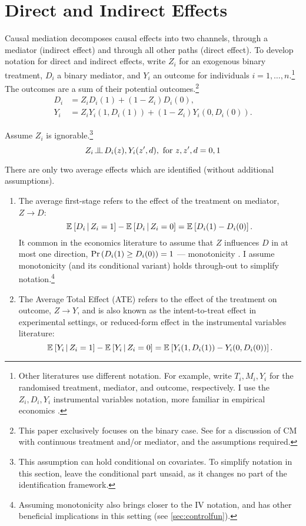 \section{Direct and Indirect Effects}
\label{sec:mediation}
Causal mediation decomposes causal effects into two channels, through a mediator (indirect effect) and through all other paths (direct effect).
To develop notation for direct and indirect effects, write $Z_i$ for an exogenous binary treatment, $D_i$ a binary mediator, and $Y_i$ an outcome for individuals $i = 1, \hdots, n$.\footnote{
    Other literatures use different notation.
    For example, \cite{imai2010identification} write $T_i, M_i, Y_i$ for the randomised treatment, mediator, and outcome, respectively.
    I use the $Z_i, D_i, Y_i$ instrumental variables notation, more familiar in empirical economics \citep{angrist1996identification}.
}
The outcomes are a sum of their potential outcomes.\footnote{
    This paper exclusively focuses on the binary case.
    See \cite{huber2020direct} for a discussion of CM with continuous treatment and/or mediator, and the assumptions required.
}
\begin{align*}
    D_i &= Z_i       D_i(1)
        + (1 - Z_i) D_i(0),  \\
    Y_i &= Z_i       Y_i(1, D_i(1))
        + (1 - Z_i) Y_i(0, D_i(0)).
\end{align*}

Assume $Z_i$ is ignorable.\footnote{
    This assumption can hold conditional on covariates.
    To simplify notation in this section, leave the conditional part unsaid, as it changes no part of the identification framework.
}
\[ Z_i \indep  D_i(z), Y_i(z', d), \textnormal{ for } z, z', d = 0, 1 \]

There are only two average effects which are identified (without additional assumptions).
\begin{enumerate}
    \item The average first-stage refers to the effect of the treatment on mediator, $Z \to D$:
    \[ \mathbb{E}_{} \left[ D_i \, \middle\vert \, Z_i = 1 \right] - \mathbb{E}_{} \left[ D_i \, \middle\vert \, Z_i = 0 \right]
        = \mathbb{E}_{} \left[ D_i(1) - D_i(0) \right]. \]
    It common in the economics literature to assume that $Z$ influences $D$ in at most one direction, $\Pr\left( D_i(1) \geq D_i(0) \right) = 1$ --- monotonicity \citep{imbens1994identification}.
    I assume monotonicity (and its conditional variant) holds through-out to simplify notation.\footnote{
        Assuming monotonicity also brings closer to the IV notation, and has other beneficial implications in this setting (see \autoref{sec:controlfun}).
    }
    \item The Average Total Effect (ATE) refers to the effect of the treatment on outcome, $Z \to Y$, and is also known as the intent-to-treat effect in experimental settings, or reduced-form effect in the instrumental variables literature:
    \[ \mathbb{E}_{} \left[ Y_i \, \middle\vert \, Z_i = 1 \right] - \mathbb{E}_{} \left[ Y_i \, \middle\vert \, Z_i = 0 \right]
        = \mathbb{E}_{} \left[ Y_i(1, D_i(1)) - Y_i(0, D_i(0)) \right]. \]
\end{enumerate}

